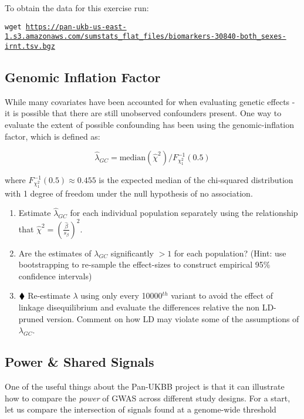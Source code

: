 \documentclass{pset}
\begin{document}
To obtain the data for this exercise run: 

\begin{center}
\texttt{wget \url{https://pan-ukb-us-east-1.s3.amazonaws.com/sumstats_flat_files/biomarkers-30840-both_sexes-irnt.tsv.bgz}}
\end{center}

\subsection*{Genomic Inflation Factor}

While many covariates have been accounted for when evaluating genetic effects - it is possible that there are still unobserved confounders present. One way to  evaluate the extent of possible confounding has been using the genomic-inflation factor, which is defined as: 

$$\hat{\lambda}_{GC} = \text{median}(\hat{\chi}^2) / F^{-1}_{\chi^2_1}(0.5)$$  

where $F^{-1}_{\chi^2_1}(0.5) \approx 0.455$ is the expected median of the chi-squared distribution with 1 degree of freedom under the null hypothesis of no association. 

\begin{enumerate}
\item Estimate $\hat{\lambda}_{GC}$ for each individual population separately using the relationship that $\hat{\chi}^2 = \left(\frac{\hat{\beta}}{s_\beta}\right)^2$. 
\item Are the estimates of $\lambda_{GC}$ significantly $> 1$ for each population? (Hint: use bootstrapping to re-sample the effect-sizes to construct empirical 95\% confidence intervals)
\item $\mathbin{\blacklozenge}$ Re-estimate $\lambda$ using only every 10000$^{th}$ variant to avoid the effect of linkage disequilibrium and evaluate the differences relative the non LD-pruned version. Comment on how LD may violate some of the assumptions of $\lambda_{GC}$.
\end{enumerate} 

\subsection*{Power \& Shared Signals}

One of the useful things about the Pan-UKBB project is that it can illustrate how to compare the \textit{power} of GWAS across different study designs. For a start, let us compare the intersection of signals found at a genome-wide threshold 
\end{document}
